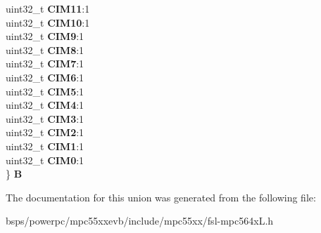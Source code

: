 \begin{DoxyCompactItemize}
\begin{tabbing}
\>uint32\_t {\bfseries CIM11}:1\\
\>uint32\_t {\bfseries CIM10}:1\\
\>uint32\_t {\bfseries CIM9}:1\\
\>uint32\_t {\bfseries CIM8}:1\\
\>uint32\_t {\bfseries CIM7}:1\\
\>uint32\_t {\bfseries CIM6}:1\\
\>uint32\_t {\bfseries CIM5}:1\\
\>uint32\_t {\bfseries CIM4}:1\\
\>uint32\_t {\bfseries CIM3}:1\\
\>uint32\_t {\bfseries CIM2}:1\\
\>uint32\_t {\bfseries CIM1}:1\\
\>uint32\_t {\bfseries CIM0}:1\\
\} {\bfseries B}\\

\end{tabbing}\end{DoxyCompactItemize}


The documentation for this union was generated from the following file\+:\begin{DoxyCompactItemize}
\item 
bsps/powerpc/mpc55xxevb/include/mpc55xx/fsl-\/mpc564x\+L.\+h\end{DoxyCompactItemize}
